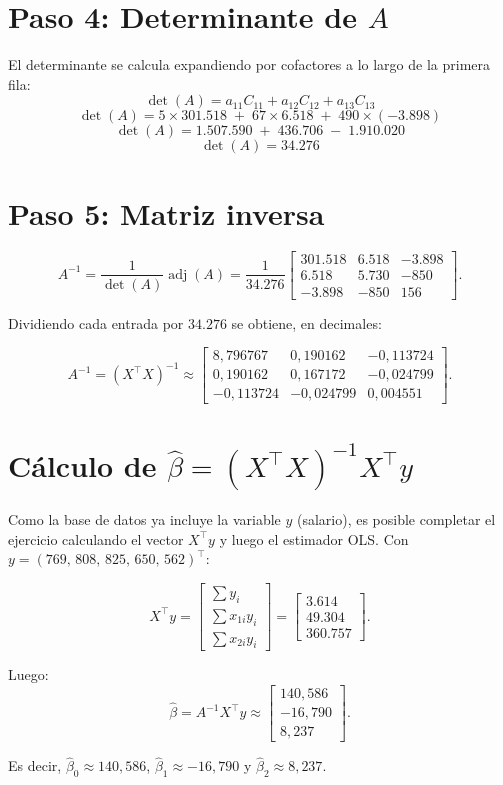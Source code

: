 \documentclass[11pt]{article}
\begin{document}
\section{Paso 4: Determinante de $A$}

El determinante se calcula expandiendo por cofactores a lo largo de la primera fila:
\[
  \det(A) = a_{11}C_{11}+a_{12}C_{12}+a_{13}C_{13}
\]
\[
  \det(A) = 5\times 301.518 \;+\; 67\times 6.518 \;+\; 490\times(-3.898)
\]
\[
  \det(A) = 1.507.590 \;+\; 436.706 \;-\; 1.910.020
\]
\[
  \boxed{\det(A) = 34.276}
\]

\section{Paso 5: Matriz inversa}

\[
  A^{-1} = \frac{1}{\det(A)}\operatorname{adj}(A)
  = \frac{1}{34.276}
  \begin{bmatrix}
    301.518 & 6.518 & -3.898\\
    6.518 & 5.730 & -850\\
    -3.898 & -850 & 156
  \end{bmatrix}.
\]

Dividiendo cada entrada por $34.276$ se obtiene, en decimales:

\[
  A^{-1} = (X^\top X)^{-1} \approx
  \begin{bmatrix}
    8,796767 & 0,190162 & -0,113724\\
    0,190162 & 0,167172 & -0,024799\\
    -0,113724 & -0,024799 & 0,004551
  \end{bmatrix}.
\]


\section{ Cálculo de $\hat\beta=(X^\top X)^{-1}X^\top y$}

Como la base de datos ya incluye la variable $y$ (salario), es posible completar el ejercicio calculando el vector $X^\top y$ y luego el estimador OLS. Con $y=(769,\,808,\,825,\,650,\,562)^\top$:

\[
  X^\top y =
  \begin{bmatrix}
    \sum y_i \\ \sum x_{1i} y_i \\ \sum x_{2i} y_i
  \end{bmatrix}
  =
  \begin{bmatrix}
    3.614\\
    49.304\\
    360.757
  \end{bmatrix}.
\]

Luego:
\[
  \hat\beta = A^{-1}X^\top y \approx
  \begin{bmatrix}
    140,586\\
    -16,790\\
    8,237
  \end{bmatrix}.
\]

Es decir, $\hat\beta_0\approx 140,586$, $\hat\beta_1\approx -16,790$ y $\hat\beta_2\approx 8,237$.
\end{document}
